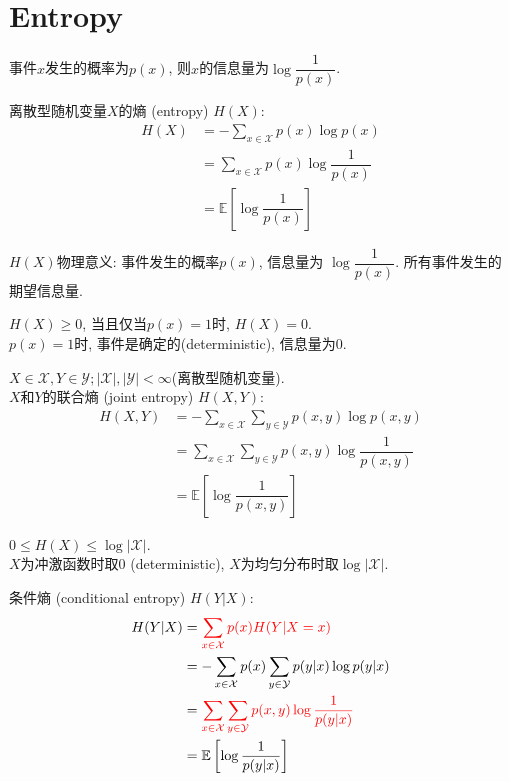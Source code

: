 \section{Entropy}

\begin{definition}
事件$x$发生的概率为$p(x)$, 则$x$的信息量为$\log\dfrac{1}{p(x)}$.
\end{definition}

\begin{definition}
离散型随机变量$X$的熵 (entropy) $H(X)$:
\begin{align*}
    H(X)&= -\sum_{x\in\mathcal{X}}p(x)\log p(x) \\
        &= \sum_{x\in\mathcal{X}}p(x)\log\dfrac{1}{p(x)} \\
        &= \mathbb{E}\left[\log\dfrac{1}{p(x)}\right]
\end{align*}
\end{definition}

$H(X)$物理意义: 事件发生的概率$p(x)$, 信息量为 $\log\dfrac{1}{p(x)}$. 所有事件发生的期望信息量.

\begin{proposition}
$H(X)\geq 0$, 当且仅当$p(x)=1$时, $H(X)=0$.\\
$p(x)=1$时, 事件是确定的(deterministic), 信息量为0.
\end{proposition}

\begin{definition}
$X\in \mathcal{X}, Y\in\mathcal{Y}; |\mathcal{X}|,|\mathcal{Y}|<\infty$(离散型随机变量). \\
$X$和$Y$的联合熵 (joint entropy) $H(X,Y)$:
\begin{align*}
    H(X,Y)&= -\sum_{x\in\mathcal{X}}\sum_{y\in\mathcal{Y}}p(x,y)\log p(x,y) \\
        &= \sum_{x\in\mathcal{X}}\sum_{y\in\mathcal{Y}}p(x,y)\log\dfrac{1}{p(x,y)} \\
        &= \mathbb{E}\left[\log\dfrac{1}{p(x,y)}\right]
\end{align*}
\end{definition}

\begin{proposition}
$0\leq H(X)\leq \log|\mathcal{X}|$.\\
$X$为冲激函数时取$0$ (deterministic), $X$为均匀分布时取$\log|\mathcal{X}|$.
\end{proposition}


\begin{definition}
条件熵 (conditional entropy) $H(Y|X)$:
\begin{align*}
    H(Y|X)&= \textcolor{red}{\sum_{x\in\mathcal{X}}p(x)H(Y|X=x)} \\
        &= -\sum_{x\in\mathcal{X}}p(x)\sum_{y\in\mathcal{Y}}p(y|x)\log p(y|x) \\
        &= \textcolor{red}{\sum_{x\in\mathcal{X}}\sum_{y\in\mathcal{Y}}p(x,y)\log\dfrac{1}{p(y|x)}} \\
        &= \mathbb{E}\left[\log\dfrac{1}{p(y|x)}\right]
\end{align*}
\end{definition}

